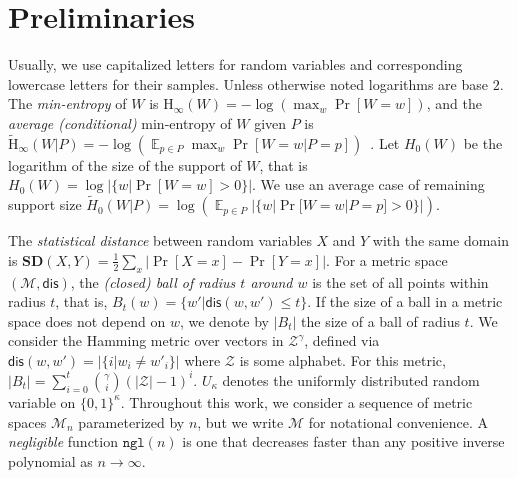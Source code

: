 \documentclass[11pt]{article}
\DeclareMathOperator*{\expe}{\mathbb{E}}
\newcommand{\dis}{\ensuremath{\mathsf{dis}}}
\newcommand{\ngl}{\ensuremath{\mathtt{ngl}}\xspace}
\newcommand{\Hoo}{\mathrm{H}_\infty}
\newcommand{\Hav}{\tilde{\mathrm{H}}_\infty}
\newcommand{\sd}{\ensuremath{\mathbf{SD}}}
\begin{document}
\section{Preliminaries}
\label{sec:preliminaries}
Usually, we use capitalized letters for random variables and corresponding lowercase letters for their samples.
 Unless otherwise noted logarithms are base $2$.
The {\em min-entropy} of $W$ is $\Hoo(W) = -\log(\max_w \Pr[W=w])$,
and the {\em average (conditional)} min-entropy of $W$ given $P$ is  $\Hav(W|P) = -\log(\expe_{p\in P} \max_{w} \Pr[W=w|P=p])$~\cite[Section 2.4]{DBLP:journals/siamcomp/DodisORS08}.   Let $H_0(W)$ be the logarithm of the size of the support of $W$,  that is $H_0(W) = \log |\{w | \Pr[W=w]>0\}|$.  We use an average case of remaining support size $\tilde{H}_0(W |P) = \log ( \expe_{p\in P} |\{w | \Pr[W=w |P=p]>0\}|)$.

The {\em statistical distance} between random variables $X$ and $Y$ with the same domain is $\sd(X,Y) = \frac12 \sum_x |\Pr[X=x] - \Pr[Y=x]|$.
For a metric space $(\mathcal{M}, \dis)$, the \emph{(closed) ball of radius $t$ around $w$} is the set of all points within radius $t$, that is, $B_t(w) = \{w'| \dis(w, w')\leq t\}$.  If the size of a ball in a metric space does not depend on $w$, we denote by $|B_t|$ the size of a ball of radius $t$.  We consider the Hamming metric over vectors in $\mathcal{Z}^\gamma$, defined via $\dis(w,w') = |\{i | w_i \neq w'_i\}|$ where $\mathcal{Z}$ is some alphabet.  For this metric, $|B_t| = \sum_{i=0}^t {\gamma \choose i} (|\mathcal{Z}|-1)^i $.  $U_\kappa$ denotes the uniformly  distributed random variable on $\{0,1\}^\kappa$.  Throughout this work, we consider a sequence of metric spaces $\mathcal{M}_n$ parameterized by $n$, but we write $\mathcal{M}$ for notational convenience. A \emph{negligible} function $\ngl(n)$ is one that decreases faster than any positive inverse polynomial as $n\rightarrow \infty$.
\end{document}
